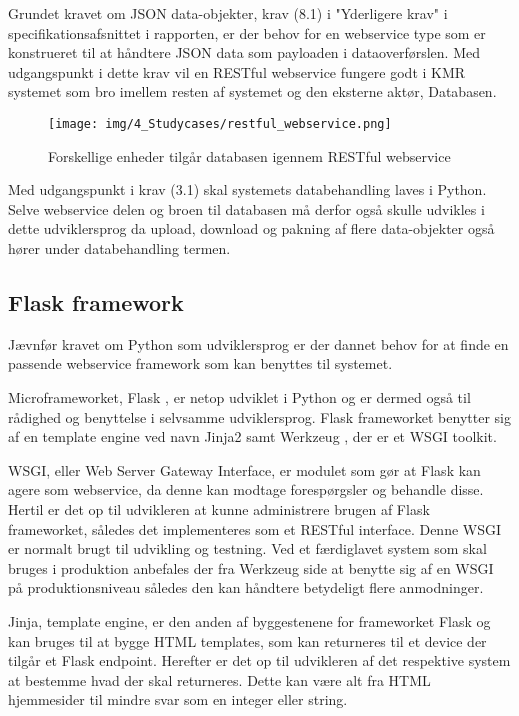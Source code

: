 \begin{appendices}
Grundet kravet om JSON data-objekter, krav (8.1) i "Yderligere krav" i specifikationsafsnittet i rapporten, er der behov for en webservice type som er konstrueret til at håndtere JSON data som payloaden i dataoverførslen.
Med udgangspunkt i dette krav vil en RESTful webservice \cite{IBM_restfull_concept} fungere godt i KMR systemet som bro imellem resten af systemet og den eksterne aktør, Databasen. \cite{restfull_concept} \\

\begin{figure}[H]
	\centering{}
	\texttt{[image: img/4\_Studycases/restful\_webservice.png]}
	\caption{Forskellige enheder tilgår databasen igennem RESTful webservice}
	\label{fig:restful_webservice}
\end{figure}


Med udgangspunkt i krav (3.1) skal systemets databehandling laves i Python. Selve webservice delen og broen til databasen må derfor også skulle udvikles i dette udviklersprog da upload, download og pakning af flere data-objekter også hører under databehandling termen. \\

\subsection{Flask framework}
Jævnfør kravet om Python som udviklersprog er der dannet behov for at finde en passende webservice framework som kan benyttes til systemet.

Microframeworket, Flask \cite{FLASK}, er netop udviklet i Python og er dermed også til rådighed og benyttelse i selvsamme udviklersprog.
Flask frameworket benytter sig af en template engine ved navn Jinja2 \cite{JINJA} samt Werkzeug \cite{WERKZEUG}, der er et WSGI toolkit.

WSGI, eller Web Server Gateway Interface, er modulet som gør at Flask kan agere som webservice, da denne kan modtage forespørgsler og behandle disse. Hertil er det op til udvikleren at kunne administrere brugen af Flask frameworket, således det implementeres som et RESTful interface. Denne WSGI er normalt brugt til udvikling og testning. Ved et færdiglavet system som skal bruges i produktion anbefales der fra Werkzeug side at benytte sig af en WSGI på produktionsniveau således den kan håndtere betydeligt flere anmodninger.

Jinja, template engine, er den anden af byggestenene for frameworket Flask og kan bruges til at bygge HTML templates, som kan returneres til et device der tilgår et Flask endpoint. Herefter er det op til udvikleren af det respektive system at bestemme hvad der skal returneres. Dette kan være alt fra HTML hjemmesider til mindre svar som en integer eller string. \\


\end{appendices}
